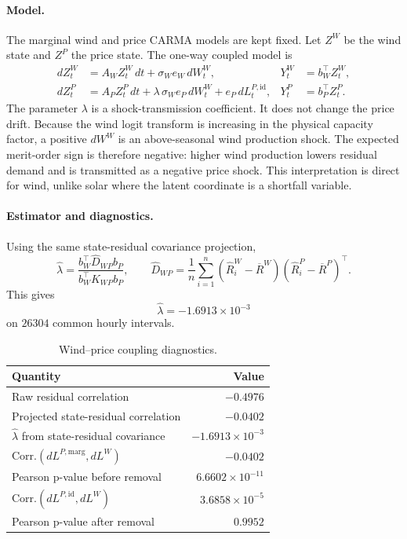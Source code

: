 \paragraph{Model.}
The marginal wind and price CARMA models are kept fixed. Let \(Z^W\) be the wind
state and \(Z^P\) the price state. The one-way coupled model is
\begin{align}
  dZ_t^W
  &=
  A_W Z_t^W\,dt
  +
  \sigma_W e_W\,dW_t^W,
  &
  Y_t^W &= b_W^\top Z_t^W ,
  \label{eq:wind-coupling-wind-state}
  \\
  dZ_t^P
  &=
  A_P Z_t^P\,dt
  +
  \lambda\,\sigma_W e_P\,dW_t^W
  +
  e_P\,dL_t^{P,\mathrm{id}},
  &
  Y_t^P &= b_P^\top Z_t^P .
  \label{eq:wind-coupling-price-state}
\end{align}
The parameter \(\lambda\) is a shock-transmission coefficient. It does not
change the price drift. Because the wind logit transform is increasing in the
physical capacity factor, a positive \(dW^W\) is an above-seasonal wind
production shock. The expected merit-order sign is therefore negative: higher
wind production lowers residual demand and is transmitted as a negative price
shock. This interpretation is direct for wind, unlike solar where the latent
coordinate is a shortfall variable.

\paragraph{Estimator and diagnostics.}
Using the same state-residual covariance projection,
\begin{equation}
  \widehat\lambda
  =
  \frac{b_W^\top \widehat D_{WP} b_P}
       {b_W^\top K_{WP} b_P},
  \qquad
  \widehat D_{WP}
  =
  \frac{1}{n}\sum_{i=1}^{n}
  (\widehat R_i^W-\overline R^W)
  (\widehat R_i^P-\overline R^P)^\top .
  \label{eq:wind-coupling-lambda-estimator}
\end{equation}
This gives
\[
  \widehat\lambda = -1.6913\times 10^{-3}
\]
on \(26304\) common hourly intervals.

\begin{table}[H]
  \centering
  \caption{Wind--price coupling diagnostics.}
  \label{tab:wind-price-coupling-diagnostics}
  \begin{tabular}{@{}lr@{}}
    \toprule
    Quantity & Value \\
    \midrule
    Raw residual correlation & \(-0.4976\) \\
    Projected state-residual correlation & \(-0.0402\) \\
    \(\widehat\lambda\) from state-residual covariance & \(-1.6913{\times}10^{-3}\) \\
    Corr.\((dL^{P,\mathrm{marg}},dL^W)\) & \(-0.0402\) \\
    Pearson p-value before removal & \(6.6602{\times}10^{-11}\) \\
    Corr.\((dL^{P,\mathrm{id}},dL^W)\) & \(3.6858{\times}10^{-5}\) \\
    Pearson p-value after removal & \(0.9952\) \\
    \bottomrule
  \end{tabular}
\end{table}

